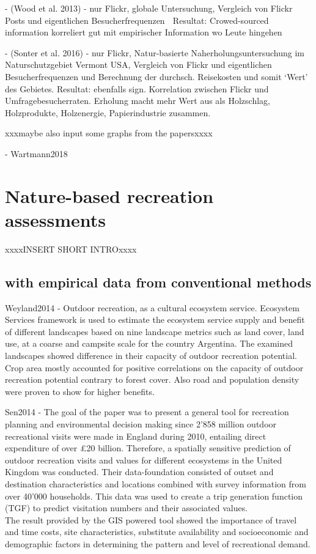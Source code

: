 - (Wood et al. 2013) - nur Flickr, globale Untersuchung, Vergleich von Flickr Posts und eigentlichen Besucherfrequenzen
 Resultat: Crowed-sourced information korreliert gut mit empirischer Information wo Leute hingehen

- (Sonter et al. 2016) - nur Flickr, Natur-basierte Naherholungsuntersuchung im Naturschutzgebiet Vermont USA, Vergleich von Flickr und eigentlichen Besucherfrequenzen und Berechnung der durchsch. Reisekosten und somit ‘Wert’ des Gebietes.
Resultat: ebenfalls sign. Korrelation zwischen Flickr und Umfragebesucherraten. Erholung macht mehr Wert aus als Holzschlag, Holzprodukte, Holzenergie, Papierindustrie zusammen.

xxxmaybe also input some graphs from the papersxxxx

- Wartmann2018

\section{Nature-based recreation assessments}
xxxxINSERT SHORT INTROxxxx
\subsection{with empirical data from conventional methods}
Weyland2014 - Outdoor recreation, as a cultural ecosystem service. Ecosystem Services framework is used to estimate the ecosystem service supply and benefit of different landscapes based on nine landscape metrics such as land cover, land use, at a coarse and campsite scale for the country Argentina. The examined landscapes showed difference in their capacity of outdoor recreation potential. Crop area mostly accounted for positive correlations on the capacity of outdoor recreation potential contrary to forest cover. Also road and population density were proven to show for higher benefits.

Sen2014 - The goal of the paper was to present a general tool for recreation planning and environmental decision making since 2'858 million outdoor recreational visits were made in England during 2010, entailing direct expenditure of over £20 billion. Therefore, a spatially sensitive prediction of outdoor recreation visits and values for different ecosystems in the United Kingdom was conducted. Their data-foundation consisted of outset and destination characteristics and locations combined with survey information from over 40'000 households. This data was used to create a trip generation function (TGF) to predict visitation numbers and their associated values.\\
The result provided by the GIS powered tool showed the importance of travel and time costs, site characteristics, substitute availability and socioeconomic and demographic factors in determining the pattern and level of recreational demand.

